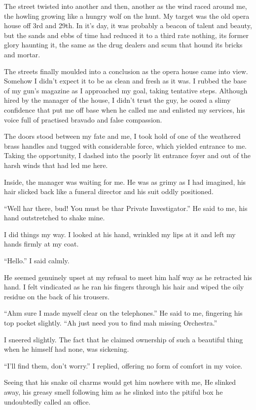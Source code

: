 The street twisted into another and then, another as the wind raced
around me, the howling growing like a hungry wolf on the hunt. My
target was the old opera house off 3rd and 29th. In it's day,
it was probably a beacon of talent and beauty, but the sands and
ebbs of time had reduced it to a third rate nothing, its former
glory haunting it, the same as the drug dealers and scum that hound
its bricks and mortar.

The streets finally moulded into a conclusion as the opera house
came into view. Somehow I didn't expect it to be as clean and
fresh as it was. I rubbed the base of my gun's magazine as I
approached my goal, taking tentative steps. Although hired by the
manager of the house, I didn't trust the guy, he oozed a
slimy confidence that put me off base when he called me and
enlisted my services, his voice full of practised bravado and false
compassion.



The doors stood between my fate and me, I took hold of one of the
weathered brass handles and tugged with considerable force, which
yielded entrance to me. Taking the opportunity, I dashed into the
poorly lit entrance foyer and out of the harsh winds that had led
me here.

Inside, the manager was waiting for me. He was as grimy as I had
imagined, his hair slicked back like a funeral director and his
suit oddly positioned.

``Well har there, bud! You must be thar Private
Investigator.'' He said to me, his hand outstretched to shake
mine.

I did things my way. I looked at his hand, wrinkled my lips at it
and left my hands firmly at my coat.

``Hello.'' I said calmly.

He seemed genuinely upset at my refusal to meet him half way as he
retracted his hand. I felt vindicated as he ran his fingers through
his hair and wiped the oily residue on the back of his
trousers.

``Ahm sure I made myself clear on the telephones.'' He
said to me, fingering his top pocket slightly. ``Ah just need
you to find mah missing Orchestra.''

I sneered slightly. The fact that he claimed ownership of such a
beautiful thing when he himself had none, was sickening.

``I'll find them, don't worry.'' I replied,
offering no form of comfort in my voice.

Seeing that his snake oil charms would get him nowhere with me, He
slinked away, his greasy smell following him as he slinked into the
pitiful box he undoubtedly called an office.



